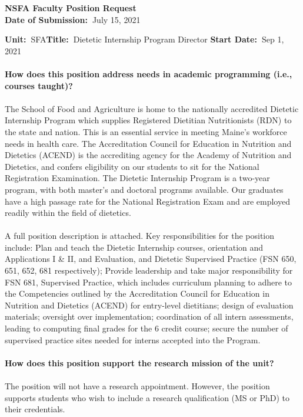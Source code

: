 \documentclass[11pt]{article}
\begin{document}
\sloppy \rmfamily
\begin{center}\textbf{NSFA Faculty Position Request\\Date of Submission:~}July 15, 2021\end{center}

\noindent\textbf{Unit:~}SFA\hfill\textbf{Title:~}Dietetic Internship Program Director \hfill \textbf{Start Date:~}Sep 1, 2021\\~\\
\textbf{How does this position address needs in academic programming (i.e., courses taught)?}\\~\\
\small\sffamily The School of Food and Agriculture is home to the nationally accredited Dietetic Internship Program which supplies Registered Dietitian Nutritionists (RDN) to the state and nation. This is an essential service in meeting Maine's workforce needs in health care. The Accreditation Council for Education in Nutrition and Dietetics (ACEND) is the accrediting agency for the Academy of Nutrition and Dietetics, and confers eligibility on our students to sit for the National Registration Examination. The Dietetic Internship Program is a two-year program, with both master’s and doctoral programs available. Our graduates have a high passage rate for the National Registration Exam and are employed readily within the field of dietetics.
\\~\\
A full position description is attached. Key responsibilities for the position include: Plan and teach the Dietetic Internship courses, orientation and Applications I \& II, and Evaluation, and Dietetic Supervised Practice (FSN 650, 651, 652, 681 respectively);  Provide leadership and take major responsibility for FSN 681, Supervised Practice, which includes curriculum planning to adhere to the Competencies outlined by the Accreditation Council for Education in Nutrition and Dietetics (ACEND) for entry-level dietitians; design of evaluation materials; oversight over implementation; coordination of all intern assessments, leading to computing final grades for the 6 credit course; secure the number of supervised practice sites needed for interns accepted into the Program. 
\\~\\
\textbf{\rmfamily How does this position support the research mission of the unit?}\\~\\
The position will not have a research appointment. However, the position supports students who wish to include a research qualification (MS or PhD) to their credentials. 
\end{document}
